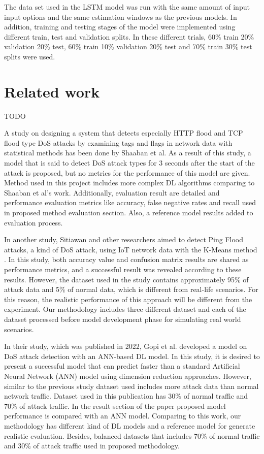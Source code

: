 \documentclass{article}
\begin{document}
The data set used in the LSTM model was run with the same amount of input input options and the same estimation windows as the previous models. In addition, training and testing stages of the model were implemented using different train, test and validation splits. In these different trials, 60\% train 20\% validation 20\% test, 60\% train 10\% validation 20\% test and 70\% train 30\% test splits were used.

\section{Related work}

TODO


A study on designing a system that detects especially HTTP flood and TCP flood type DoS attacks by examining tags and flags in network data with statistical methods has been done by Shaaban et al\cite{Shaaban}. As a result of this study, a model that is said to detect DoS attack types for 3 seconds after the start of the attack is proposed, but no metrics for the performance of this model are given. Method used in this project includes more complex DL algorithms comparing to Shaaban et al's work. Additionally, evaluation result are detailed and performance evaluation metrics like accuracy, false negative rates and recall used in proposed method evaluation section. Also, a reference model results added to evaluation process.

In another study, Sitiawan and other researchers aimed to detect Ping Flood attacks, a kind of DoS attack, using IoT network data with the K-Means method \cite{Stiawan}. 
In this study, both accuracy value and confusion matrix results are shared as performance metrics, and a successful result was revealed according to these results. However, the dataset used in the study contains approximately 95\% of attack data and 5\% of normal data, which is different from real-life scenarios. For this reason, the realistic performance of this approach will be different from the experiment. Our methodology includes three different dataset and each of the dataset processed before model development phase for simulating real world scenarios.

In their study, which was published in 2022, Gopi et al. developed a model on DoS attack detection with an ANN-based DL model\cite{Gopi}. In this study, it is desired to present a successful model that can predict faster than a standard Artificial Neural Network (ANN) model using dimension reduction approaches. However, similar to the previous study dataset used includes more attack data than normal network traffic. Dataset used in this publication has 30\% of normal traffic and 70\% of attack traffic. In the result section of the paper proposed model performance is compared with an ANN model. Comparing to this work, our methodology has different kind of DL models and a reference model for generate realistic evaluation. Besides, balanced datasets that includes 70\% of normal traffic and 30\% of attack traffic used in proposed methodology.
\end{document}

